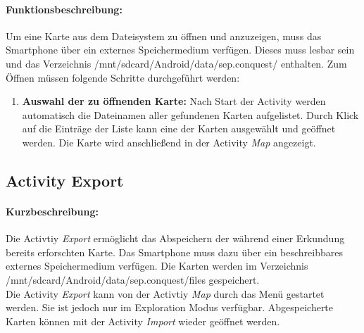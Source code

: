 \documentclass[10pt,a4paper]{article}
\begin{document}
		\paragraph*{Funktionsbeschreibung:}
		Um eine Karte aus dem Dateisystem zu \"offnen und anzuzeigen, muss das Smartphone über ein externes Speichermedium verfügen. Dieses muss
		lesbar sein und das Verzeichnis /mnt/sdcard/Android/data/sep.conquest/ enthalten. Zum Öffnen m\"ussen folgende Schritte durchgef\"uhrt
		werden:
		\begin{enumerate}
 			\item \textbf{Auswahl der zu \"offnenden Karte:} Nach Start der Activity werden automatisch die Dateinamen aller gefundenen Karten
 			aufgelistet. Durch Klick auf die Eintr\"age der Liste kann eine der Karten ausgewählt und geöffnet werden. Die Karte wird anschließend in
 			der Activity \textit{Map} angezeigt. \\
 		\end{enumerate}
 	
 	\subsection{Activity Export}
 		\paragraph*{Kurzbeschreibung:}
 		Die Activtiy \textit{Export} ermöglicht das Abspeichern der während einer Erkundung bereits erforschten Karte. Das Smartphone muss dazu über
 		ein beschreibbares externes Speichermedium verfügen. Die Karten werden im Verzeichnis /mnt/sdcard/Android/data/sep.conquest/files
 		gespeichert. \\
 		Die Activity \textit{Export} kann von der Activtiy \textit{Map} durch das Menü gestartet werden. Sie ist jedoch nur im Exploration Modus
 		verfügbar. Abgespeicherte Karten können mit der Activity \textit{Import} wieder geöffnet werden.
 		
\end{document}
